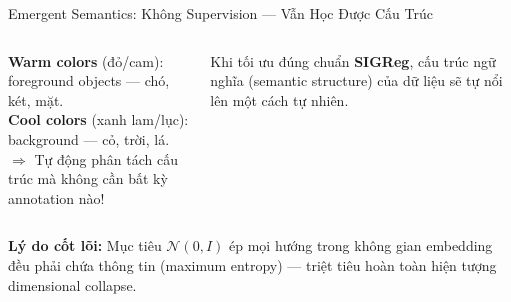 \documentclass[aspectratio=169,9pt]{beamer}
\begin{document}
\begin{frame}{Emergent Semantics: Không Supervision — Vẫn Học Được Cấu Trúc}
\begin{columns}[T]

\begin{goodbox}
\footnotesize \textbf{Warm colors} (đỏ/cam): foreground objects — chó, két, mặt.\\[5pt]
\textbf{Cool colors} (xanh lam/lục): background — cỏ, trời, lá.\\[5pt]
$\Rightarrow$ Tự động phân tách cấu trúc mà không cần bất kỳ annotation nào!
\end{goodbox}

\vspace{0.6em}
\begin{accentbox}
\footnotesize Khi tối ưu đúng chuẩn \textbf{SIGReg}, cấu trúc ngữ nghĩa (semantic structure) của dữ liệu sẽ tự nổi lên một cách tự nhiên.
\end{accentbox}

\end{columns}

\vspace{0.8em}
\begin{primarybox}
\footnotesize \textbf{Lý do cốt lõi:} Mục tiêu $\mathcal{N}(0,I)$ ép mọi hướng trong không gian embedding đều phải chứa thông tin (maximum entropy) — triệt tiêu hoàn toàn hiện tượng dimensional collapse.
\end{primarybox}
\end{frame}
\end{document}

